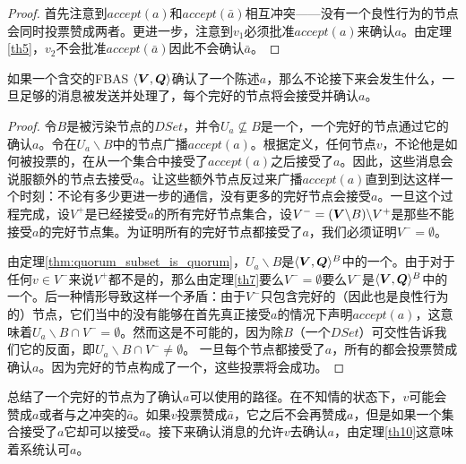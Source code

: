 \begin{proof}
	首先注意到$accept(a)$和$accept(\bar a)$相互冲突——没有一个良性行为的节点会同时投票赞成两者。更进一步，注意到$v_1$必须批准$accept(a)$来确认$a$。由定理\ref{th5}，$v_2$不会批准$accept(\bar a)$因此不会确认$\bar a$。
\end{proof}

\begin{theorem}\label{th10}
	如果一个含{\quorum}交的FBAS $\langle{\bm V},{\bm Q}\rangle$确认了一个陈述$a$，那么不论接下来会发生什么，一旦足够的消息被发送并处理了，每个完好的节点将会接受并确认$a$。
\end{theorem}

\begin{proof}
	令$B$是被污染节点的$DSet$，并令$U_a\not \subseteq B$是一个{\quorum}，一个完好的节点通过它的确认$a$。令在$U_a\backslash B$中的节点广播$accept(a)$。根据定义，任何节点$v$，不论他是如何被投票的，在从一个{\vblock}集合中接受了$accept(a)$之后接受了$a$。因此，这些消息会说服额外的节点去接受$a$。让这些额外节点反过来广播$accept(a)$直到到达这样一个时刻：不论有多少更进一步的通信，没有更多的完好节点会接受$a$。一旦这个过程完成，设$V^+$是已经接受$a$的所有完好节点集合，设$V^-=({\bm V}\backslash B)\backslash V^+$是那些不能接受$a$的完好节点集。为证明所有的完好节点都接受了$a$，我们必须证明$V^-=\emptyset$。

	由定理\ref{thm:quorum_subset_is_quorum}，$U_a\backslash B$是$\langle{\bm V},{\bm Q}\rangle^{B}$中的一个{\quorum}。由于对于任何$v\in V^-$来说$V^+$都不是{\vblock}的，那么由定理\ref{th7}要么$V^-=\emptyset$要么$V^-$是$\langle{\bm V},{\bm Q}\rangle^{B}$中的一个{\quorum}。后一种情形导致这样一个矛盾：由于$V^-$只包含完好的（因此也是良性行为的）节点，它们当中的没有能够在首先真正接受$a$的情况下声明$accept(a)$，这意味着$U_a\backslash B\cap V^-=\emptyset$。然而这是不可能的，因为除$B$（一个$DSet$）{\quorum}可交性告诉我们它的反面，即$U_a\backslash B\cap V^-\neq\emptyset$。	一旦每个节点都接受了$a$，所有的都会投票赞成确认$a$。因为完好的节点构成了一个{\quorum}，这些投票将会成功。
\end{proof}

总结了一个完好的节点为了确认$a$可以使用的路径。在不知情的状态下，$v$可能会赞成$a$或者与之冲突的$\bar a$。如果$v$投票赞成$\bar a$，它之后不会再赞成$a$，但是如果一个{\vblock}集合接受了$a$它却可以接受$a$。接下来确认消息的{\quorum}允许$v$去确认$a$，由定理\ref{th10}这意味着系统认可$a$。